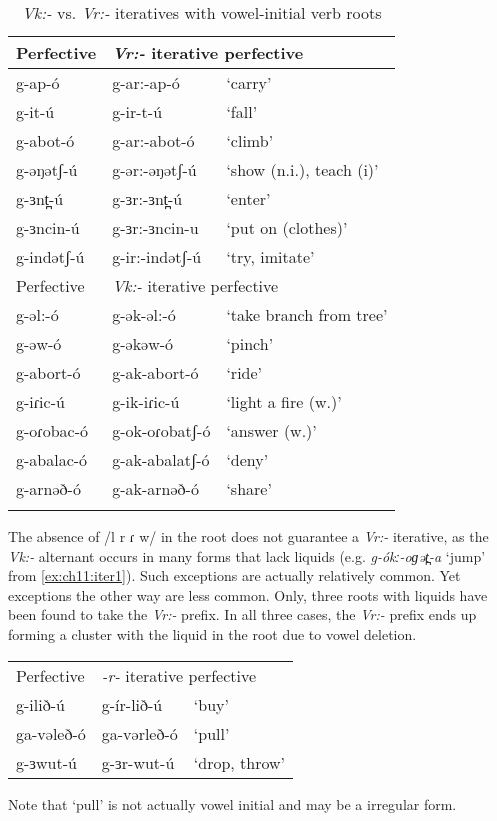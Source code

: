 \begin{table}
\begin{tabular}[t]{lll}%
\lsptoprule
Perfective	&	\multicolumn{2}{l}{\textit{Vr:-} iterative perfective}\\
\midrule
g-ap-ó 		& g-ar:-ap-ó 	& `carry'\\
{g-it-ú} 	& {g-ir-t-ú} 	& `fall'\\
g-abot-ó 	& g-ar:-abot-ó 	& `climb'\\
{g-əŋətʃ-ú} & g-ər:-əŋətʃ-ú & `show (n.i.), teach (i)'\\
{g-ɜnt̪-ú} 	& g-ɜr:-ɜnt̪-ú 	& `enter'\\
g-ɜncin-ú 	& g-ɜr:-ɜncin-u & `put on (clothes)'\\
g-indətʃ-ú 	& g-ir:-indətʃ-ú &  `try, imitate'\\
\midrule 
Perfective	&	\multicolumn{2}{l}{\textit{Vk:-} iterative perfective}\\
\midrule
g-əl:-ó 	&	g-ək-əl:-ó &  `take branch from tree' \\
g-əw-ó  	&  g-əkəw-ó  & `pinch'\\
g-abort-ó	&	g-ak-abort-ó &	`ride' \\
g-iɾic-ú 	&	g-ik-iɾic-ú & `light a fire (w.)'\\
g-oɾobac-ó 	&	g-ok-oɾobatʃ-ó & `answer (w.)'\\
g-abalac-ó 	& 	g-ak-abalatʃ-ó 	& `deny'\\
g-arnəð-ó 	& g-ak-arnəð-ó & `share'\\
\lspbottomrule
\end{tabular}
\caption{\textit{Vk:-} vs. \textit{Vr:-} iteratives with vowel-initial verb roots}\label{tab:ch11:viter} 
\end{table}

The absence of /l r ɾ w/ in the root does not guarantee a \textit{Vr:-} iterative, as the \textit{Vk:-} alternant occurs in many forms that lack liquids (e.g. \textit{g-ókː-oɡət̪-a} `jump' from \ref{ex:ch11:iter1}). Such exceptions are actually relatively common. Yet exceptions the other way are less common. Only, three roots with liquids have been found to take the \textit{Vr:-} prefix. In all three cases, the \textit{Vr:-} prefix ends up forming a cluster with the liquid in the root due to vowel deletion. 

\ea
\begin{tabular}[t]{lll}
Perfective	&	\multicolumn{2}{l}{\textit{-r-} iterative perfective}\\
g-ilið-ú 	&	g-ír-lið-ú	&	‘buy’ \\
ga-vəleð-ó & ga-vərleð-ó & `pull'\\
g-ɜwut-ú &  g-ɜr-wut-ú & `drop, throw'\\
\end{tabular}
\z 
Note that `pull' is not actually vowel initial and may be a irregular form.

